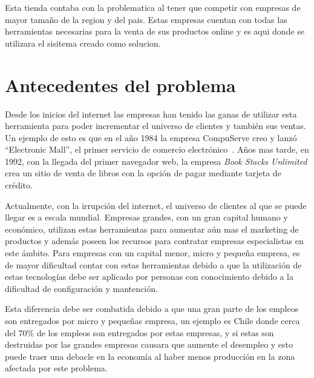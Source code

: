 Esta tienda contaba con la problematica al tener que competir con empresas de mayor 
tamaño de la region y del pais. Estas empresas cuentan con todas las herramientas
necesarias para la venta de sus productos online y es aqui donde se utilizara 
el sisitema creado como solucion. 


\section{Antecedentes del problema}

Desde los inicios del internet las empresas han tenido las ganas de utilizar
esta herramienta para poder incrementar el universo de clientes y también sus
ventas.
Un ejemplo de esto es que en el año 1984 la empresa CompuServe creo y lanzó
``Electronic Mall'', el primer servicio de comercio electrónico~\cite{Def:1}.
Años mas tarde, en 1992, con la llegada del primer navegador web, la empresa
\emph{Book Stacks Unlimited} crea un sitio de venta de libros con la opción de
pagar mediante tarjeta de crédito.

Actualmente, con la irrupción del internet, el universo de clientes al que se
puede llegar es a escala mundial.
Empresas grandes, con un gran capital humano y económico, utilizan estas
herramientas para aumentar aún mas el marketing de productos y además poseen los
recursos para contratar empresas especialistas en este ámbito.
Para empresas con un capital menor, micro y pequeña empresa, es de mayor
dificultad contar con estas herramientas debido a que la utilización de estas
tecnologías debe ser aplicado por personas con conocimiento debido a la dificultad
de configuración y mantención.

Esta diferencia debe ser combatida debido a que una gran parte de los empleos
son entregados por micro y pequeñas empresa, un ejemplo es Chile donde cerca del
70\% de los empleos son entregados por estas empresas, y si estas son destruidas
por las grandes empresas causara que aumente el desempleo y esto puede traer una
debacle en la economía al haber menos producción en la zona afectada por este
problema.

